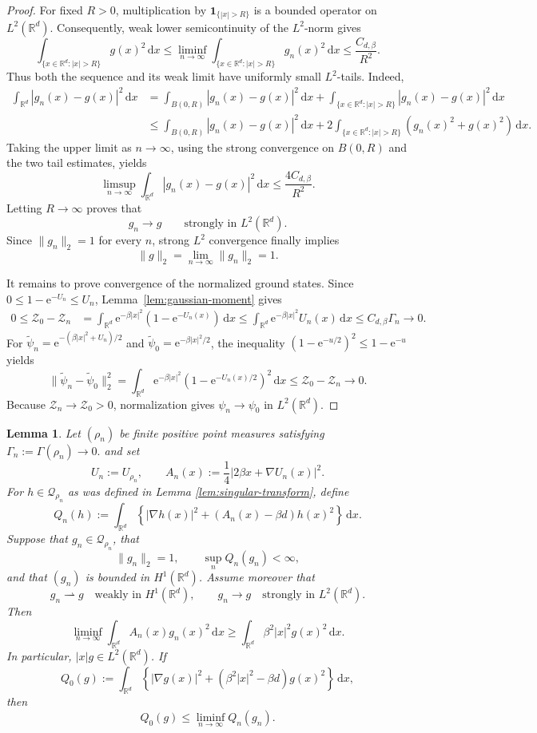 \documentclass[12pt,reqno,letterpaper]{amsart}
\newtheorem{lemma}[theorem]{Lemma}
\theoremstyle{definition}
\theoremstyle{remark}
\numberwithin{equation}{section}
\newcommand{\R}{\mathbb R}
\newcommand{\dd}{\,\mathrm d}
\newcommand{\ee}{\mathrm e}
\newcommand{\be}{\beta}
\begin{document}
\begin{proof}
For fixed \(R>0\), multiplication by
\(\mathbf1_{\{|x|>R\}}\) is a bounded operator on \(L^2(\R^d)\).
Consequently, weak lower semicontinuity of the \(L^2\)-norm gives
\[
 \int_{\{x\in\R^d:|x|>R\}}g(x)^2\dd x
 \le
 \liminf_{n\to\infty}
 \int_{\{x\in\R^d:|x|>R\}}g_n(x)^2\dd x
 \le \frac{C_{d,\be}}{R^2}.
\]
Thus both the sequence and its weak limit have uniformly small
\(L^2\)-tails.  Indeed,
\begin{align*}
 \int_{\R^d}|g_n(x)-g(x)|^2\dd x
 &=
 \int_{B(0,R)}|g_n(x)-g(x)|^2\dd x+
 \int_{\{x\in\R^d:|x|>R\}}|g_n(x)-g(x)|^2\dd x\\
 &\le
 \int_{B(0,R)}|g_n(x)-g(x)|^2\dd x+
 2\int_{\{x\in\R^d:|x|>R\}}(g_n(x)^2+g(x)^2)\dd x.
\end{align*}
Taking the upper limit as \(n\to\infty\), using the strong convergence on
\(B(0,R)\) and the two tail estimates, yields
\[
 \limsup_{n\to\infty}
 \int_{\R^d}|g_n(x)-g(x)|^2\dd x
 \le \frac{4C_{d,\be}}{R^2}.
\]
Letting \(R\to\infty\) proves that
\[
 g_n\longrightarrow g
 \qquad\text{strongly in }L^2(\R^d).
\]
Since \(\|g_n\|_2=1\) for every \(n\), strong \(L^2\) convergence finally
implies
\[
 \|g\|_2=\lim_{n\to\infty}\|g_n\|_2=1.
\]

It remains to prove convergence of the normalized ground states.  Since
\(0\le1-\ee^{-U_n}\le U_n\), Lemma~\ref{lem:gaussian-moment} gives
\begin{align*}
 0\le\mathcal Z_0-\mathcal Z_n
 &=\int_{\R^d}\ee^{-\be|x|^2}
   (1-\ee^{-U_n(x)})\dd x\le\int_{\R^d}\ee^{-\be|x|^2}U_n(x)\dd x
 \le C_{d,\be}\Gamma_n\longrightarrow0.
\end{align*}
For
\(\widetilde\psi_n=\ee^{-(\be|x|^2+U_n)/2}\) and
\(\widetilde\psi_0=\ee^{-\be|x|^2/2}\), the inequality
\((1-\ee^{-u/2})^2\le1-\ee^{-u}\) yields
\[
 \|\widetilde\psi_n-\widetilde\psi_0\|_2^2
 =\int_{\R^d}\ee^{-\be|x|^2}
   (1-\ee^{-U_n(x)/2})^2\dd x
 \le\mathcal Z_0-\mathcal Z_n\longrightarrow0.
\]
Because \(\mathcal Z_n\to\mathcal Z_0>0\), normalization gives
\(\psi_n\to\psi_0\) in \(L^2(\R^d)\).
\end{proof}

\begin{lemma}
\label{lem:oscillator-liminf}
Let \((\rho_n)\) be finite positive point measures satisfying
$ \Gamma_n:=\Gamma(\rho_n)\to 0.$
and set
\[
 U_n:=U_{\rho_n},
 \qquad
 A_n(x):=\frac14|2\be x+\nabla U_n(x)|^2.
\]
For \(h\in\mathcal Q_{\rho_n}\) as was defined in Lemma \ref{lem:singular-transform}, define
\[
 Q_n(h):=
 \int_{\R^d}
 \left\{
 |\nabla h(x)|^2+
 (A_n(x)-\be d)h(x)^2
 \right\}\dd x.
\]
Suppose that \(g_n\in\mathcal Q_{\rho_n}\), that
\[
 \|g_n\|_2=1,
 \qquad
 \sup_n Q_n(g_n)<\infty,
\]
and that \((g_n)\) is bounded in \(H^1(\R^d)\).  Assume moreover that
\[
 g_n\rightharpoonup g
 \quad\text{weakly in }H^1(\R^d),
 \qquad
 g_n\longrightarrow g
 \quad\text{strongly in }L^2(\R^d).
\]
Then
\[
 \liminf_{n\to\infty}
 \int_{\R^d}A_n(x)g_n(x)^2\dd x
 \ge
 \int_{\R^d}\be^2|x|^2g(x)^2\dd x.
\]
In particular, \(|x|g\in L^2(\R^d)\).  If
\[
 Q_0(g):=
 \int_{\R^d}
 \left\{
 |\nabla g(x)|^2+
 (\be^2|x|^2-\be d)g(x)^2
 \right\}\dd x,
\]
then
\[
 Q_0(g)\le\liminf_{n\to\infty}Q_n(g_n).
\]
\end{lemma}
\end{document}
